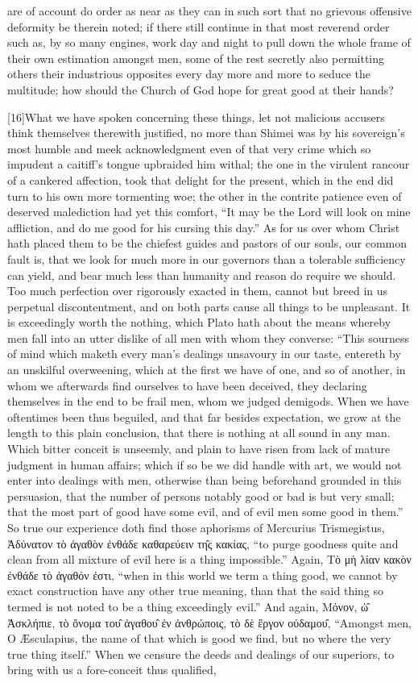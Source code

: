 are of account do order as near as they can in such sort that no grievous offensive deformity be therein noted; if there still continue in that most reverend order such as, by so many engines, work day and night to pull down the whole frame of their own  estimation amongst men, some of the rest secretly also permitting others their industrious opposites every day more and more to seduce the multitude; how should the Church of God hope for great good at their hands?

[16]What we have spoken concerning these things, let not malicious accusers think themselves therewith justified, no more than Shimei was by his sovereign’s most humble and meek acknowledgment even of that very crime which so impudent a caitiff’s tongue upbraided him withal; the one in the virulent rancour of a cankered affection, took that delight for the present, which in the end did turn to his own more tormenting woe; the other in the contrite patience even of deserved malediction had yet this comfort, “It may be the Lord will look on mine affliction, and do me good for his cursing this day.” As for us over whom Christ hath placed them to be the chiefest guides and pastors of our souls, our common fault is, that we look for much more in our governors than a tolerable sufficiency can yield, and bear much less than humanity and reason do require we should. Too much perfection over rigorously exacted in them, cannot but breed in us perpetual discontentment, and on both parts cause all things to be unpleasant. It is exceedingly worth the nothing, which Plato hath about the means whereby men fall into an utter dislike of all men with whom they converse: “This sourness of mind which maketh every man’s dealings unsavoury in our taste, entereth by an unskilful overweening, which at the first we have of one, and so of another, in whom we afterwards find ourselves to have been deceived, they declaring themselves in the end to be frail men, whom we judged demigods. When we have oftentimes been thus beguiled, and that far besides expectation, we grow at the length to this plain conclusion, that there is  nothing at all sound in any man. Which bitter conceit is unseemly, and plain to have risen from lack of mature judgment in human affairs; which if so be we did handle with art, we would not enter into dealings with men, otherwise than being beforehand grounded in this persuasion, that the number of persons notably good or bad is but very small; that the most part of good have some evil, and of evil men some good in them.” So true our experience doth find those aphorisms of Mercurius Trismegistus, Ἀδύνατον τὸ ἀγαθὸν ἐνθάδε καθαρεύειν τη̑ς κακίας, “to purge goodness quite and clean from all mixture of evil here is a thing impossible.” Again, Τὸ μὴ λίαν κακὸν ἐνθάδε τὸ ἀγαθόν ἐστι, “when in this world we term a thing good, we cannot by exact construction have any other true meaning, than that the said thing so termed is not noted to be a thing exceedingly evil.” And again, Μόνον, ὡ̑ Ἀσκλήπιε, τὸ ὄνομα του̑ ἀγαθου̑ ἐν ἀνθρώποις, τὸ δὲ ἔργον οὐδαμου̑, “Amongst men, O Æsculapius, the name of that which is good we find, but no where the very true thing itself.” When we censure the deeds and dealings of our superiors, to bring with us a fore-conceit thus qualified, 